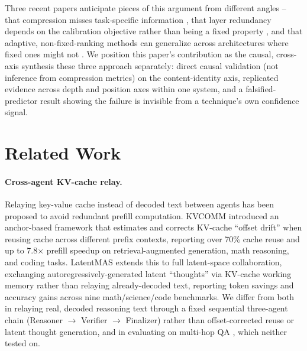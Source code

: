 \documentclass[11pt]{article}
\begin{document}
Three recent papers anticipate pieces of this argument from different
angles -- that compression misses task-specific information
\citep{pitfallskv2026}, that layer redundancy depends on the calibration
objective rather than being a fixed property \citep{rethinkredundancy2026},
and that adaptive, non-fixed-ranking methods can generalize across
architectures where fixed ones might not \citep{adak2026}. We position
this paper's contribution as the causal, cross-axis synthesis these three
approach separately: direct causal validation (not inference from
compression metrics) on the content-identity axis, replicated evidence
across depth and position axes within one system, and a
falsified-predictor result showing the failure is invisible from a
technique's own confidence signal.

\section{Related Work}

\paragraph{Cross-agent KV-cache relay.} Relaying key-value cache instead
of decoded text between agents has been proposed to avoid redundant
prefill computation. KVCOMM \citep{kvcomm2025} introduced an anchor-based
framework that estimates and corrects KV-cache ``offset drift'' when
reusing cache across different prefix contexts, reporting over 70\% cache
reuse and up to 7.8$\times$ prefill speedup on retrieval-augmented
generation, math reasoning, and coding tasks. LatentMAS
\citep{latentmas2026} extends this to full latent-space collaboration,
exchanging autoregressively-generated latent ``thoughts'' via KV-cache
working memory rather than relaying already-decoded text, reporting token
savings and accuracy gains across nine math/science/code benchmarks. We
differ from both in relaying real, decoded reasoning text through a fixed
sequential three-agent chain (Reasoner $\rightarrow$ Verifier
$\rightarrow$ Finalizer) rather than offset-corrected reuse or latent
thought generation, and in evaluating on multi-hop QA
\citep{hotpotqa2018}, which neither tested on.
\end{document}
